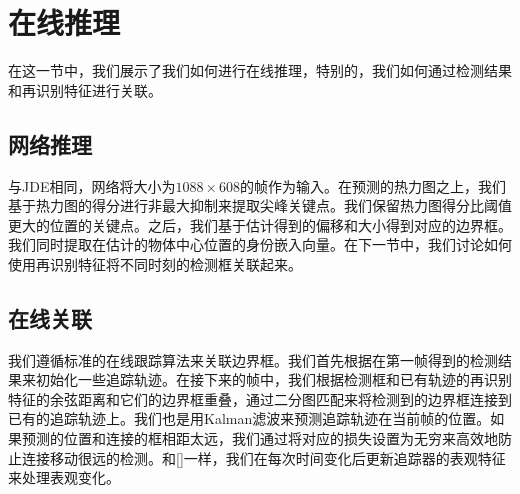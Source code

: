\documentclass{ctexart}
\begin{document}
\section{在线推理}
在这一节中，我们展示了我们如何进行在线推理，特别的，我们如何通过检测结果和再识别特征进行关联。
\subsection{网络推理}
与JDE相同，网络将大小为$1088\times 608$的帧作为输入。在预测的热力图之上，我们基于热力图的得分进行非最大抑制来提取尖峰关键点。我们保留热力图得分比阈值更大的位置的关键点。之后，我们基于估计得到的偏移和大小得到对应的边界框。我们同时提取在估计的物体中心位置的身份嵌入向量。在下一节中，我们讨论如何使用再识别特征将不同时刻的检测框关联起来。
\subsection{在线关联}
我们遵循标准的在线跟踪算法来关联边界框。我们首先根据在第一帧得到的检测结果来初始化一些追踪轨迹。在接下来的帧中，我们根据检测框和已有轨迹的再识别特征的余弦距离和它们的边界框重叠，通过二分图匹配来将检测到的边界框连接到已有的追踪轨迹上。我们也是用Kalman滤波来预测追踪轨迹在当前帧的位置。如果预测的位置和连接的框相距太远，我们通过将对应的损失设置为无穷来高效地防止连接移动很远的检测。和[]一样，我们在每次时间变化后更新追踪器的表观特征来处理表观变化。
\end{document}
